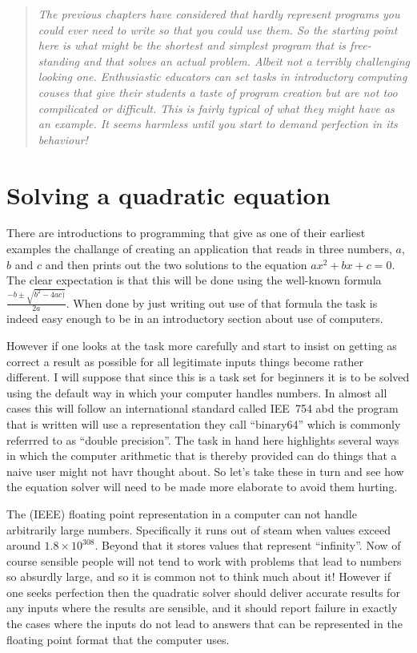 \begin{quotation}\textit{
The previous chapters have considered that hardly represent programs
you could ever need to write so that you could use them. So the starting
point here is what might be the shortest and simplest program that
is free-standing and that solves an actual problem. Albeit not a terribly
challenging looking one.
Enthusiastic educators can set tasks in introductory computing couses
that give their students a taste of program creation but are not
too compilicated or difficult. This is fairly typical of what they might
have as an example. It seems harmless until you start to demand perfection in
its behaviour!
}\end{quotation}
\section{Solving a quadratic equation}
There are introductions to programming that give as one of their
earliest examples the challange of creating an application that
reads in three numbers, $a$, $b$ and $c$ and then prints out the
two solutions to the equation $a x^2 + b x + c = 0$. The clear
expectation is that this will be done using the well-known formula
$\frac{-b \pm \sqrt{b^2 - 4 a c)}}{2 a}$. When done by just writing out
use of that formula the task is indeed easy enough to be in an
introductory section about use of computers.

However if one looks at the task more carefully and start to insist on
getting as correct a result as possible for all legitimate inputs things
become rather different. I will suppose that since this is a task
set for beginners it is to be solved using the default way in which
your computer handles numbers. In almost all cases this will follow
an international standard called IEE~754 abd the program that is written
will use a representation they call ``binary64'' which is commonly referrred
to as ``double precision''. The task in hand here highlights several
ways in which the computer arithmetic that is thereby provided can
do things that a naive user might not havr thought about. So let's
take these in turn and see how the equation solver will need to
be made more elaborate to avoid them hurting.

The (IEEE) floating point representation in a computer can not handle
arbitrarily large numbers. Specifically it runs out of steam when values
exceed around $1.8 \times 10^{308}$. Beyond that it stores values
that represent ``infinity''. Now of course sensible people will
not tend to work with problems that lead to numbers so absurdly large,
and so it is common not to think much about it! However if one seeks
perfection then the quadratic solver should deliver accurate results for
any inputs where the results are sensible, and it should report
failure in exactly the cases where the inputs do not lead to answers that
can be represented in the floating point format that the computer uses.

